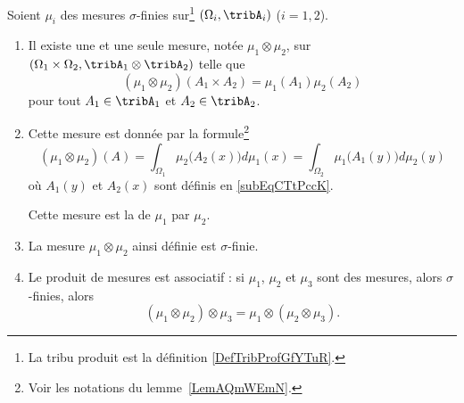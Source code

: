 \begin{theoremDef}   \label{ThoWWAjXzi}
	Soient \( \mu_i\) des mesures \( \sigma\)-finies sur\footnote{La tribu produit est la définition \ref{DefTribProfGfYTuR}.} \( (\Omega_i,\tribA_i)\) (\( i=1,2\)).
	\begin{enumerate}
		\item		\label{ITEMooMMAAooVnHmzc}

		      Il existe une et une seule mesure, notée \( \mu_1\otimes \mu_2\), sur \( (\Omega_1\times\Omega_2,\tribA_1\otimes\tribA_2)\) telle que
		      \begin{equation}    \label{EqOIuWLQU}
			      (\mu_1\otimes\mu_2)(A_1\times A_2)=\mu_1(A_1)\mu_2(A_2)
		      \end{equation}
		      pour tout \( A_1\in \tribA_1\) et \( A_2\in\tribA_2\).
		\item
		      Cette mesure est donnée par la formule\footnote{Voir les notations du lemme~\ref{LemAQmWEmN}.}
		      \begin{equation}   \label{EqDFxuGtH}
			      (\mu_1\otimes \mu_2)(A)=\int_{\Omega_1}\mu_2\big( A_2(x) \big)d\mu_1(x)=\int_{\Omega_2}\mu_1\big( A_1(y) \big)d\mu_2(y)
		      \end{equation}
		      où \( A_1(y)\) et \( A_2(x)\) sont définis en \eqref{subEqCTtPccK}.

		      Cette mesure est la  de \( \mu_1\) par \( \mu_2\).
		\item
		      La mesure \( \mu_1\otimes \mu_2\) ainsi définie est \( \sigma\)-finie.
		\item		\label{ITEMooUOATooQpdcND}
		      Le produit de mesures est associatif : si \( \mu_1\), \( \mu_2\) et \( \mu_3\) sont des mesures, alors \( \sigma\)-finies, alors
		      \begin{equation}
			      (\mu_1\otimes \mu_2)\otimes \mu_3=\mu_1\otimes (\mu_2\otimes \mu_3).
		      \end{equation}
	\end{enumerate}
\end{theoremDef}

